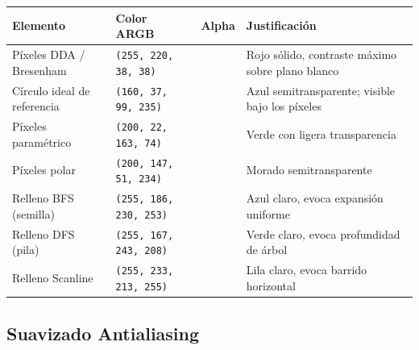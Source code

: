 \documentclass[
  spanish,
  a4paper,
  12pt,
]{article}
\newcommand{\passthrough}[1]{#1}
\newcounter{none} %
\begin{document}
{\def\LTcaptype{none} %
\begin{longtable}[]{@{}
  >{\raggedright\arraybackslash}p{}
  >{\raggedright\arraybackslash}p{}
  >{\raggedright\arraybackslash}p{}
  >{\raggedright\arraybackslash}p{}@{}}
\toprule\noalign{}
\begin{minipage}[b]{\linewidth}\raggedright
Elemento
\end{minipage} & \begin{minipage}[b]{\linewidth}\raggedright
Color ARGB
\end{minipage} & \begin{minipage}[b]{\linewidth}\raggedright
Alpha
\end{minipage} & \begin{minipage}[b]{\linewidth}\raggedright
Justificación
\end{minipage} \\
\midrule\noalign{}
\endhead
\bottomrule\noalign{}
\endlastfoot
Píxeles DDA / Bresenham & \passthrough{\lstinline!(255, 220, 38, 38)!} &
255 & Rojo sólido, contraste máximo sobre plano blanco \\
Círculo ideal de referencia &
\passthrough{\lstinline!(160, 37, 99, 235)!} & 160 & Azul
semitransparente; visible bajo los píxeles \\
Píxeles paramétrico & \passthrough{\lstinline!(200, 22, 163, 74)!} & 200
& Verde con ligera transparencia \\
Píxeles polar & \passthrough{\lstinline!(200, 147, 51, 234)!} & 200 &
Morado semitransparente \\
Relleno BFS (semilla) & \passthrough{\lstinline!(255, 186, 230, 253)!} &
255 & Azul claro, evoca expansión uniforme \\
Relleno DFS (pila) & \passthrough{\lstinline!(255, 167, 243, 208)!} &
255 & Verde claro, evoca profundidad de árbol \\
Relleno Scanline & \passthrough{\lstinline!(255, 233, 213, 255)!} & 255
& Lila claro, evoca barrido horizontal \\
\end{longtable}
}

\subsection{Suavizado
Antialiasing}\label{suavizado-antialiasing}
\end{document}
